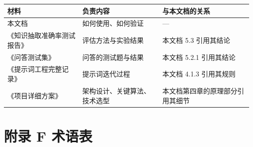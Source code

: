 \documentclass[UTF8,a4paper,11pt]{ctexrep}
\begin{document}
\begin{center}
\small
\begin{tabularx}{\linewidth}{@{}XXX@{}}
\toprule
材料 & 负责内容 & 与本文档的关系 \\
\midrule
本文档 & 如何使用、如何验证 & — \\
《知识抽取准确率测试报告》 & 评估方法与实验结果 & 本文档 5.3 引用其结论 \\
《问答测试集》 & 问答的测试题与结果 & 本文档 5.2.1 引用其结论 \\
《提示词工程完整记录》 & 提示词迭代过程 & 本文档 4.1.3 引用其规则 \\
《项目详细方案》 & 架构设计、关键算法、技术选型 & 本文档第四章的原理部分引用其细节 \\
\bottomrule
\end{tabularx}
\end{center}

\section*{附录 F 术语表}
\end{document}
